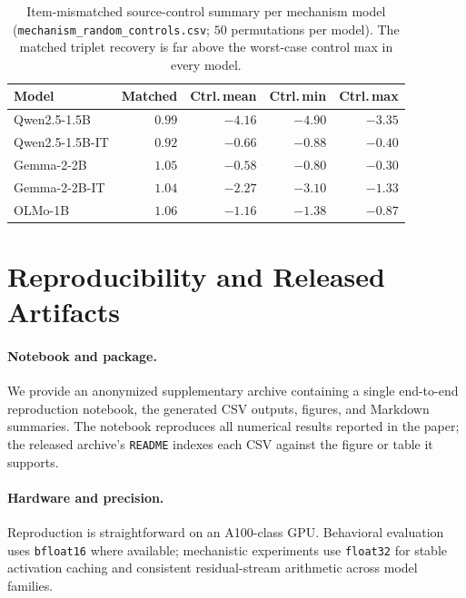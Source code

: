 \documentclass[11pt]{article}
\begin{document}
\begin{table}[H]
\centering
\scriptsize
\setlength{\tabcolsep}{2pt}
\begin{tabular*}{\columnwidth}{@{\extracolsep{\fill}}lrrrr@{}}
\toprule
Model & Matched & Ctrl.\,mean & Ctrl.\,min & Ctrl.\,max \\
\midrule
Qwen2.5-1.5B    & $0.99$ & $-4.16$ & $-4.90$ & $-3.35$ \\
Qwen2.5-1.5B-IT & $0.92$ & $-0.66$ & $-0.88$ & $-0.40$ \\
Gemma-2-2B      & $1.05$ & $-0.58$ & $-0.80$ & $-0.30$ \\
Gemma-2-2B-IT   & $1.04$ & $-2.27$ & $-3.10$ & $-1.33$ \\
OLMo-1B         & $1.06$ & $-1.16$ & $-1.38$ & $-0.87$ \\
\bottomrule
\end{tabular*}
\caption{Item-mismatched source-control summary per mechanism model
(\texttt{mechanism\_random\_controls.csv}; $50$ permutations per model). The matched triplet
recovery is far above the worst-case control max in every model.}
\label{tab:random_summary}
\end{table}

\FloatBarrier
\section{Reproducibility and Released Artifacts}
\label{app:reproducibility}

\paragraph{Notebook and package.}
We provide an anonymized supplementary archive containing a single end-to-end reproduction
notebook, the generated CSV outputs, figures, and Markdown summaries. The notebook reproduces
all numerical results reported in the paper; the released archive's \texttt{README} indexes
each CSV against the figure or table it supports.

\paragraph{Hardware and precision.}
Reproduction is straightforward on an A100-class GPU. Behavioral evaluation uses
\texttt{bfloat16} where available; mechanistic experiments use \texttt{float32} for stable
activation caching and consistent residual-stream arithmetic across model families.
\end{document}
